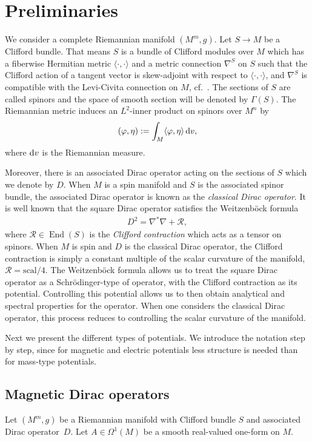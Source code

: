 \documentclass[10pt,a4paper]{amsart}
\numberwithin{equation}{section}
\begin{document}
\section{Preliminaries}
We consider a complete Riemannian manifold $(M^m,g)$. Let $S\to M$ be a Clifford bundle. That means $S$ is a bundle of Clifford modules over $M$ which has a fiberwise Hermitian metric $\langle\cdot,\cdot\rangle$ and a metric connection $\nabla^S$ on $S$ such that the Clifford action of a tangent vector is skew-adjoint with respect to $\langle\cdot,\cdot\rangle$, and $\nabla^S$ is compatible with the Levi-Civita connection on $M$, cf.\ \cite[Definition~3.4]{Roe}. The sections of $S$ are called spinors and the space of smooth section will be denoted by $\Gamma(S)$.	
The Riemannian metric induces an $L^2$-inner product on spinors over $M^n$ by
\[( \varphi, \eta ) := \int_M \langle\varphi, \eta\rangle\, {\rm d}v,\]
where ${\rm d}v$ is the Riemannian measure.

Moreover, there is an associated Dirac operator acting on the sections of $S$ which we denote by $D$. When $M$ is a spin manifold and $S$ is the associated spinor bundle, the associated Dirac operator is known as the \emph{classical Dirac operator}. It is well known that the square Dirac operator satisfies the Weitzenb\"ock formula
\begin{align*}%
D^2=\nabla^*\nabla +\mathcal{R},
\end{align*}
where $\mathcal{R}\in \operatorname{End}(S)$ is the \emph{Clifford contraction} which acts as a tensor on spinors. When $M$ is spin and $D$ is the classical Dirac operator, the Clifford contraction is simply a constant multiple of the scalar curvature of the manifold, $\mathcal{R}=\mathrm{scal}/4$. The Weitzenb\"ock formula allows us to treat the square Dirac operator as a Schr\"odinger-type of operator, with the Clifford contraction as its potential. Controlling this potential allows us to then obtain analytical and spectral properties for the operator. When one considers the classical Dirac operator, this process reduces to controlling the scalar curvature of the manifold.

Next we present the different types of potentials. We introduce the notation step by step, since for magnetic and electric potentials less structure is needed than for mass-type potentials.

\subsection{Magnetic Dirac operators}
Let $(M^m,g)$ be a Riemannian manifold with Clifford bundle $S$ and associated Dirac operator~$D$. Let $A\in \Omega^1(M)$ be a smooth real-valued one-form on $M$.
\end{document}
